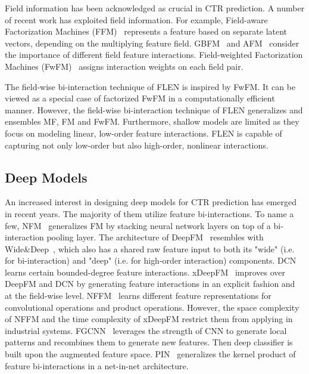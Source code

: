 \documentclass[sigconf]{acmart}
\begin{document}
Field information has been acknowledged as crucial in CTR prediction. 
A number of recent work has exploited field information. 
 For example, Field-aware Factorization Machines (FFM)~\citep{juan2017field} represents a feature based on separate latent vectors, depending on the multiplying feature field. GBFM~\citep{cheng2014gradient} and AFM~\citep{xiao2017attentional} consider the importance of different field feature interactions. Field-weighted Factorization Machines (FwFM)~\citep{pan2018field} assigns interaction weights on each field pair. 
 
The field-wise bi-interaction technique of FLEN is inspired by FwFM. It can be viewed as a special case of factorized FwFM in a computationally efficient manner. However, the field-wise bi-interaction technique of FLEN generalizes and ensembles MF, FM and FwFM.
Furthermore, shallow models are limited as they focus on modeling linear, low-order feature interactions. 
FLEN is capable of capturing not only low-order but also high-order, nonlinear interactions.

\subsection{Deep Models}
An increased interest in designing deep models for CTR prediction has emerged in recent years. 
The majority of them utilize feature bi-interactions. 
To name a few, NFM~\citep{he2017neural} generalizes FM by stacking neural network layers on top of a bi-interaction pooling layer. 
The architecture of DeepFM~\citep{guo2017deepfm} resembles with Wide\&Deep~\citep{cheng2016wide}, which also has a shared raw feature input to both its "wide" (i.e. for bi-interaction) and "deep" (i.e. for high-order interaction) components. 
DCN~\citep{wang2017deep} learns certain bounded-degree feature interactions. 
xDeepFM~\citep{lian2018xdeepfm}  improves over DeepFM and DCN by generating feature interactions in an explicit fashion and at the field-wise level.   
NFFM~\citep{Yang2019Operation} learns different feature representations for convolutional operations and product operations. 
However, the space complexity of NFFM and the time complexity of xDeepFM  restrict them from applying in industrial systems.
FGCNN~\citep{Liu2019Feature} leverages the strength of CNN to generate local patterns and recombines them to generate new features. Then deep classifier is built upon the augmented feature space.
PIN~\citep{qu2018product} generalizes the kernel product of feature bi-interactions in a net-in-net architecture.
\end{document}
